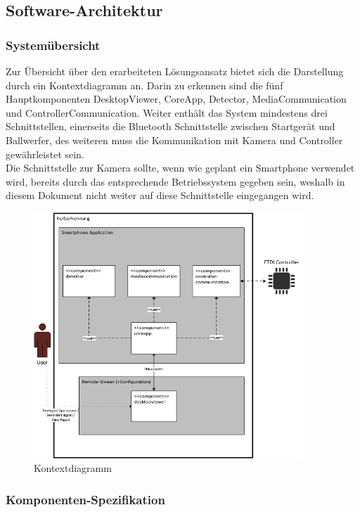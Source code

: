 \subsection{Software-Architektur}
	\subsubsection{Systemübersicht}
	Zur Übersicht über den erarbeiteten Lösungsansatz bietet sich die Darstellung durch ein Kontextdiagramm an. Darin zu erkennen sind die fünf Hauptkomponenten  DesktopViewer, CoreApp, Detector, MediaCommunication und ControllerCommunication. Weiter enthält das System mindestens drei Schnittstellen, einerseits die Bluetooth Schnittstelle zwischen Startgerät und Ballwerfer, des weiteren muss die Kommunikation mit Kamera und Controller gewährleistet sein.\\ 
	Die Schnittstelle zur Kamera sollte, wenn wie geplant ein Smartphone verwendet wird, bereits durch das entsprechende Betriebssystem gegeben sein, weshalb in diesem Dokument nicht weiter auf diese Schnittstelle eingegangen wird. 
\begin{figure}[h!]
		\centering
		\includegraphics[width=0.9\textwidth]{Enddokumentation/Loesungskonzept/Bilder/Kontextdiagramm_v2.jpg}
		\caption{Kontextdiagramm}		
\end{figure}


	\subsubsection{Komponenten-Spezifikation}
